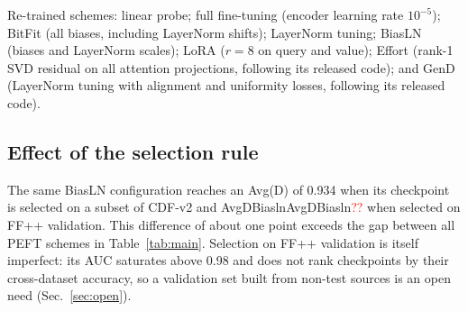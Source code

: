 \documentclass[fonts]{icst}
\newcommand{\num}[1]{\ifcsname #1\endcsname\csname #1\endcsname\else\textcolor{red}{??}\fi}
\begin{document}
Re-trained schemes: linear probe; full fine-tuning (encoder learning rate $10^{-5}$); BitFit (all biases, including LayerNorm shifts); LayerNorm tuning; BiasLN (biases and LayerNorm scales); LoRA ($r{=}8$ on query and value); Effort (rank-1 SVD residual on all attention projections, following its released code); and GenD (LayerNorm tuning with alignment and uniformity losses, following its released code).

\subsection{Effect of the selection rule}
The same BiasLN configuration reaches an Avg(D) of 0.934 when its checkpoint is selected on a subset of CDF-v2 and \num{AvgDBiasln} when selected on FF++ validation. This difference of about one point exceeds the gap between all PEFT schemes in Table~\ref{tab:main}. Selection on FF++ validation is itself imperfect: its AUC saturates above 0.98 and does not rank checkpoints by their cross-dataset accuracy, so a validation set built from non-test sources is an open need (Sec.~\ref{sec:open}).

\begin{table}[!t]
\centering
\caption{Video AUC of re-trained schemes under one protocol (FF++ c23 training, checkpoint selected on FF++ validation). Avg(D) and Avg(M) are mean $\pm$ std over $n$ seeds; per-dataset values are seed means. Bold: best; shaded: second best.}
\label{tab:main}
\resizebox{\textwidth}{!}{}
\vspace{3mm}
\caption{Ablation of selective and low-rank schemes and of $L_2$ normalization before the classifier (same protocol). Bold: best; shaded: second best.}
\label{tab:ablation}
\resizebox{0.85\textwidth}{!}{}
\end{table}
\end{document}
